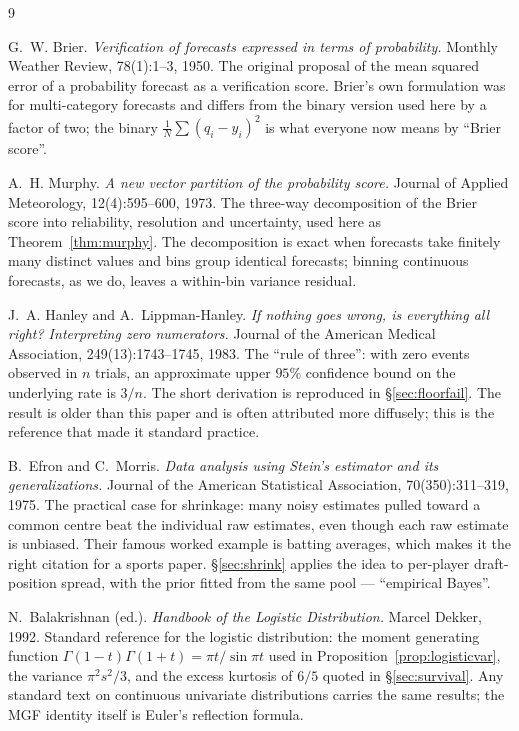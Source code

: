 \documentclass[10pt,a4paper]{article}
\theoremstyle{plain}
\theoremstyle{definition}
\theoremstyle{remark}
\begin{document}
\begin{thebibliography}{9}

G.~W. Brier.
\emph{Verification of forecasts expressed in terms of probability.}
Monthly Weather Review, 78(1):1--3, 1950.
The original proposal of the mean squared error of a probability forecast as a
verification score. Brier's own formulation was for multi-category forecasts and
differs from the binary version used here by a factor of two; the binary
$\frac{1}{N}\sum(q_i - y_i)^2$ is what everyone now means by ``Brier score''.

A.~H. Murphy.
\emph{A new vector partition of the probability score.}
Journal of Applied Meteorology, 12(4):595--600, 1973.
The three-way decomposition of the Brier score into reliability, resolution and
uncertainty, used here as Theorem~\ref{thm:murphy}. The decomposition is exact when
forecasts take finitely many distinct values and bins group identical forecasts;
binning continuous forecasts, as we do, leaves a within-bin variance residual.

J.~A. Hanley and A.~Lippman-Hanley.
\emph{If nothing goes wrong, is everything all right? Interpreting zero numerators.}
Journal of the American Medical Association, 249(13):1743--1745, 1983.
The ``rule of three'': with zero events observed in $n$ trials, an approximate upper
$95\%$ confidence bound on the underlying rate is $3/n$. The short derivation is
reproduced in \S\ref{sec:floorfail}. The result is older than this paper and is often
attributed more diffusely; this is the reference that made it standard practice.

B.~Efron and C.~Morris.
\emph{Data analysis using Stein's estimator and its generalizations.}
Journal of the American Statistical Association, 70(350):311--319, 1975.
The practical case for shrinkage: many noisy estimates pulled toward a common centre
beat the individual raw estimates, even though each raw estimate is unbiased. Their
famous worked example is batting averages, which makes it the right citation for a
sports paper. \S\ref{sec:shrink} applies the idea to per-player draft-position spread,
with the prior fitted from the same pool --- ``empirical Bayes''.

N.~Balakrishnan (ed.).
\emph{Handbook of the Logistic Distribution.}
Marcel Dekker, 1992.
Standard reference for the logistic distribution: the moment generating function
$\Gamma(1-t)\Gamma(1+t) = \pi t/\sin\pi t$ used in Proposition~\ref{prop:logisticvar},
the variance $\pi^2 s^2/3$, and the excess kurtosis of $6/5$ quoted in
\S\ref{sec:survival}. Any standard text on continuous univariate distributions carries
the same results; the MGF identity itself is Euler's reflection formula.


\end{thebibliography}
\end{document}
